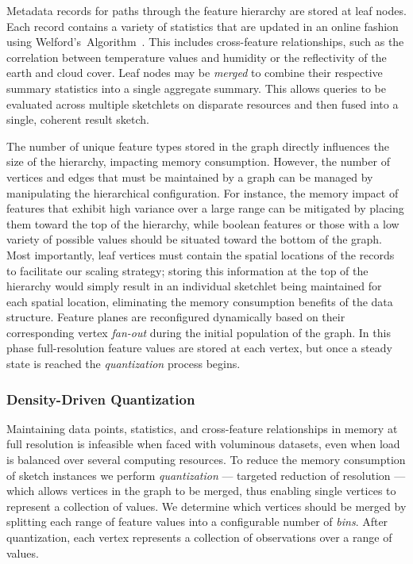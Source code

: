 Metadata records for paths through the feature hierarchy are stored at leaf nodes. Each record contains a variety of statistics that are updated in an online fashion using Welford's~Algorithm~\cite{welford1962note}. This includes cross-feature relationships, such as the correlation between temperature values and humidity or the reflectivity of the earth and cloud cover. Leaf nodes may be \emph{merged} to combine their respective summary statistics into a single aggregate summary. This allows queries to be evaluated across multiple sketchlets on disparate resources and then fused into a single, coherent result sketch.

The number of unique feature types stored in the graph directly influences the size of the hierarchy, impacting memory consumption. However, the number of vertices and edges that must be maintained by a graph can be managed by manipulating the hierarchical configuration. For instance, the memory impact of features that exhibit high variance over a large range can be mitigated by placing them toward the top of the hierarchy, while boolean features or those with a low variety of possible values should be situated toward the bottom of the graph. Most importantly, leaf vertices must contain the spatial locations of the records to facilitate our scaling strategy; storing this information at the top of the hierarchy would simply result in an individual sketchlet being maintained for each spatial location, eliminating the memory consumption benefits of the data structure. Feature planes are reconfigured dynamically based on their corresponding vertex \emph{fan-out} during the initial population of the graph. In this phase full-resolution feature values are stored at each vertex, but once a steady state is reached the \emph{quantization} process begins.

\subsubsection{Density-Driven Quantization}
Maintaining data points, statistics, and cross-feature relationships in memory at full resolution is infeasible when faced with voluminous datasets, even when load is balanced over several computing resources. To reduce the memory consumption of sketch instances we perform \emph{quantization} --- targeted reduction of resolution --- which allows vertices in the graph to be merged, thus enabling single vertices to represent a collection of values. We determine which vertices should be merged by splitting each range of feature values into a configurable number of \emph{bins}. After quantization, each vertex represents a collection of observations over a range of values.

